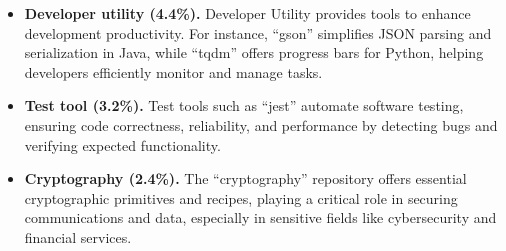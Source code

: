 \begin{itemize}[left=10pt]
\item \textbf{Developer utility (4.4\%).}  
Developer Utility provides tools to enhance development productivity. For instance, ``gson'' simplifies JSON parsing and serialization in Java, while ``tqdm'' offers progress bars for Python, helping developers efficiently monitor and manage tasks.

\item \textbf{Test tool (3.2\%).}  
Test tools such as ``jest'' automate software testing, ensuring code correctness, reliability, and performance by detecting bugs and verifying expected functionality.

\item \textbf{Cryptography (2.4\%).}  
The ``cryptography'' repository offers essential cryptographic primitives and recipes, playing a critical role in securing communications and data, especially in sensitive fields like cybersecurity and financial services.

\end{itemize}

